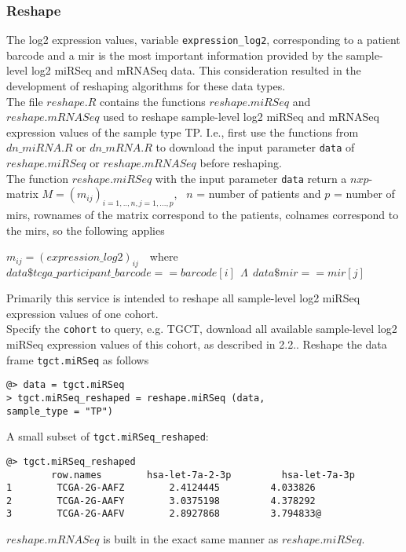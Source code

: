 \documentclass{TechReport}
\begin{document}
\subsubsection{Reshape}
The log2 expression values, variable {\tt expression\_log2}, corresponding to a
patient barcode and a mir is the most important information provided by 
the sample-level log2 miRSeq and mRNASeq data. This consideration resulted in the
development of reshaping algorithms for these data types. \\
The file $reshape.R$ contains the functions $reshape.miRSeq$ and $reshape.mRNASeq$
used to reshape sample-level log2 miRSeq and mRNASeq 
expression values of the sample type TP. I.e., first use the functions from 
$dn\_miRNA.R$ or $dn\_mRNA.R$ to download the input parameter {\tt data}
of $reshape.miRSeq$ or $reshape.mRNASeq$ before reshaping. \\
The function $reshape.miRSeq$ with the input parameter {\tt data} return a
$nxp$-matrix $M = (m_{ij})_{i=1,..,n, j=1,...,p}$, \ $n$ = number of patients and 
$p$ = number of mirs, rownames of the matrix correspond to the patients, colnames
correspond to the mirs,  so the following applies
\begin{center}
$m_{ij}= (expression\_log2)_{ij}$\ \  where \\
$data\$tcga\_participant\_barcode==barcode[i]\ \  \Lambda\ \ data\$mir==mir[j] $
\end{center}
Primarily this service is intended to reshape all sample-level log2 miRSeq
expression values of one cohort. \\
Specify the {\tt cohort} to query, e.g. TGCT, download all available sample-level
log2 miRSeq expression values of this cohort, as described 
in 2.2..
Reshape the data frame {\tt tgct.miRSeq} as follows
\begin{lstlisting}[style=base]
@> data = tgct.miRSeq
> tgct.miRSeq_reshaped = reshape.miRSeq (data, 
sample_type = "TP")
\end{lstlisting}
A small subset of {\tt tgct.miRSeq\_reshaped}:
\begin{lstlisting}[style=base]
@> tgct.miRSeq_reshaped
        row.names        hsa-let-7a-2-3p         hsa-let-7a-3p
1        TCGA-2G-AAFZ        2.4124445         4.033826
2        TCGA-2G-AAFY        3.0375198         4.378292
3        TCGA-2G-AAFV        2.8927868         3.794833@
\end{lstlisting}
$reshape.mRNASeq$ is built in the exact same manner as $reshape.miRSeq$.
\end{document}
